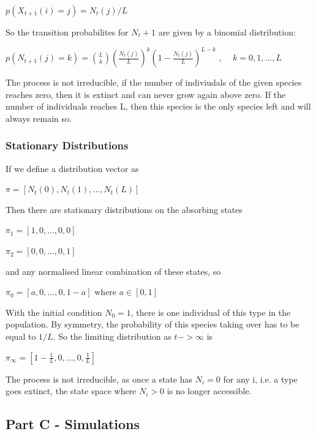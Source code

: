 \documentclass{article}
\begin{document}
$p(X_{t+1}(i) = j) = N_t(j)/L$

So the transition probabilites for $N_t+1$ are given by a binomial distribution:

$p(N_{t+1}(j) = k) = {L \choose k}(\frac{N_t(j)}{L})^k(1-\frac{N_t(j)}{L})^{L-k} \text{ , } \quad k=0,1,...,L$

The process is not irreducible, if the number of indiviudals of the given species reaches zero, then it is extinct and can never grow again above zero. If the number of individuals reaches L, then this species is the only species left and will always remain so. 

\subsubsection{Stationary Distributions}

If we define a distribution vector as

$\pi = [N_t(0), N_t(1),...,N_t(L)]$

Then there are stationary distributions on the absorbing states

$\pi_1 = [1, 0,...,0,0]$

$\pi_2 = [0, 0,...,0,1]$

and any normalised linear combination of these states, so

$\pi_0 = [a, 0,...,0,1-a] \text{ where } a \in [0,1]$ 

With the initial condition $N_0 = 1$, there is one individual of this type in the population. By symmetry, the probability of this species taking over has to be equal to $1/L$. So the limiting distribution as $t -> \infty$ is

$\pi_{\infty} = [1-\frac{1}{L},0,...,0,\frac{1}{L}]$



The process is not irreducible, as once a state has $N_i = 0$ for any i, i.e. a type goes extinct, the state space where $N_i >0$ is no longer accessible.


\subsection{Part C - Simulations}
\end{document}
